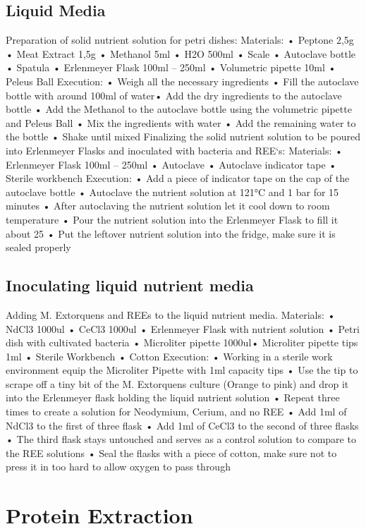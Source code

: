 \subsection{Liquid Media}
Preparation of solid nutrient solution for petri dishes:
Materials:
• Peptone 2,5g
• Meat Extract 1,5g
• Methanol 5ml
• H2O 500ml
• Scale
• Autoclave bottle
• Spatula
• Erlenmeyer Flask 100ml – 250ml
• Volumetric pipette 10ml
• Peleus Ball
Execution:
• Weigh all the necessary ingredients
• Fill the autoclave bottle with around 100ml of water• Add the dry ingredients to the autoclave bottle
• Add the Methanol to the autoclave bottle using the volumetric pipette and
Peleus Ball
• Mix the ingredients with water
• Add the remaining water to the bottle
• Shake until mixed
Finalizing the solid nutrient solution to be poured into Erlenmeyer Flasks and inoculated
with bacteria and REE`s:
Materials:
• Erlenmeyer Flask 100ml – 250ml
• Autoclave
• Autoclave indicator tape
• Sterile workbench
Execution:
• Add a piece of indicator tape on the cap of the autoclave bottle
• Autoclave the nutrient solution at 121°C and 1 bar for 15 minutes
• After autoclaving the nutrient solution let it cool down to room temperature
• Pour the nutrient solution into the Erlenmeyer Flask to fill it about 25%
• Put the leftover nutrient solution into the fridge, make sure it is sealed
properly

\subsection{Inoculating liquid nutrient media}
Adding M. Extorquens and REEs to the liquid nutrient media.
Materials:
• NdCl3 1000ul
• CeCl3 1000ul
• Erlenmeyer Flask with nutrient solution
• Petri dish with cultivated bacteria
• Microliter pipette 1000ul• Microliter pipette tips 1ml
• Sterile Workbench
• Cotton
Execution:
• Working in a sterile work environment equip the Microliter Pipette with 1ml
capacity tips
• Use the tip to scrape off a tiny bit of the M. Extorquens culture (Orange to
pink) and drop it into the Erlenmeyer flask holding the liquid nutrient solution
• Repeat three times to create a solution for Neodymium, Cerium, and no REE
• Add 1ml of NdCl3 to the first of three flask
• Add 1ml of CeCl3 to the second of three flasks
• The third flask stays untouched and serves as a control solution to compare
to the REE solutions
• Seal the flasks with a piece of cotton, make sure not to press it in too hard to
allow oxygen to pass through

\section{Protein Extraction\authorB}


